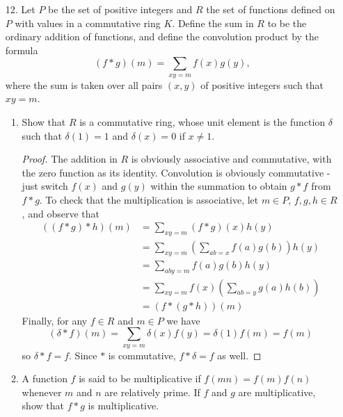 \documentclass[10pt]{article}
\begin{document}
\begin{enumerate}
\begin{enumerate}
\end{enumerate}

\item[12.] Let $P$ be the set of positive integers and $R$ the set of functions defined on $P$ with values in a commutative ring $K$.  Define the sum in $R$ to be the ordinary addition of functions, and define the convolution product by the formula
$$
(f * g)(m) = \sum_{xy=m} f(x)g(y),
$$
where the sum is taken over all pairs $(x,y)$ of positive integers such that $xy = m$.
\begin{enumerate}
\item Show that $R$ is a commutative ring, whose unit element is the function $\delta$ such that $\delta(1) = 1$ and $\delta(x)=0$ if $x \neq 1$.

\begin{proof}
The addition in $R$ is obviously associative and commutative, with the zero function as its identity.  Convolution is obviously commutative - just switch $f(x)$ and $g(y)$ within the summation to obtain $g*f$ from $f*g$.  To check that the multiplication is associative, let $m \in P$, $f,g,h \in R$, and observe that
\begin{align*}
((f*g)*h)(m) &= \sum_{xy=m} (f*g)(x)h(y) \\
&= \sum_{xy=m} \left( \sum_{ab = x}f(a)g(b) \right) h(y) \\
&= \sum_{aby=m} f(a)g(b)h(y) \\
&= \sum_{xy=m} f(x)\left( \sum_{ab = y}g(a)h(b) \right) \\
&= (f*(g*h))(m)
\end{align*}
Finally, for any $f \in R$ and $m \in P$ we have
$$
(\delta * f)(m) = \sum_{xy=m} \delta(x)f(y) = \delta(1)f(m) = f(m)
$$
so $\delta * f = f$.  Since $*$ is commutative, $f * \delta = f$ as well.
\end{proof}

\item A function $f$ is said to be multiplicative if $f(mn) = f(m)f(n)$ whenever $m$ and $n$ are relatively prime.  If $f$ and $g$ are multiplicative, show that $f * g$ is multiplicative.


\end{enumerate}
\end{enumerate}
\end{document}
